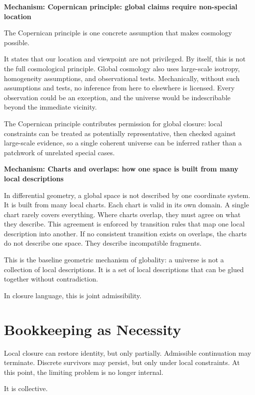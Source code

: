 \documentclass[11pt,twoside,openright]{book}
\newenvironment{mechanismbox}[1]
  {\begin{framed}\noindent\textbf{Mechanism: #1}\par\medskip}
  {\end{framed}}
\begin{document}
\begin{mechanismbox}{Copernican principle: global claims require non-special location}
The Copernican principle is one concrete assumption that makes cosmology possible.

It states that our location and viewpoint are not privileged. By itself, this is not the full cosmological principle. Global cosmology also uses large-scale isotropy, homogeneity assumptions, and observational tests. Mechanically, without such assumptions and tests, no inference from here to elsewhere is licensed. Every observation could be an exception, and the universe would be indescribable beyond the immediate vicinity.

The Copernican principle contributes permission for global closure:
local constraints can be treated as potentially representative,
then checked against large-scale evidence,
so a single coherent universe can be inferred rather than a patchwork of unrelated special cases.
\end{mechanismbox}
\begin{mechanismbox}{Charts and overlaps: how one space is built from many local descriptions}

In differential geometry, a global space is not described by one coordinate system. It is built from many local charts. Each chart is valid in its own domain. A single chart rarely covers everything. Where charts overlap, they must agree on what they describe. This agreement is enforced by transition rules that map one local description into another. If no consistent transition exists on overlaps, the charts do not describe one space. They describe incompatible fragments.

This is the baseline geometric mechanism of globality: a universe is not a collection of local descriptions. It is a set of local descriptions that can be glued together without contradiction.

In closure language, this is joint admissibility.
\end{mechanismbox}
\chapter{Bookkeeping as Necessity}

Local closure can restore identity, but only partially. Admissible continuation may terminate. Discrete survivors may persist, but only under local constraints. At this point, the limiting problem is no longer internal.

It is collective.
\end{document}
